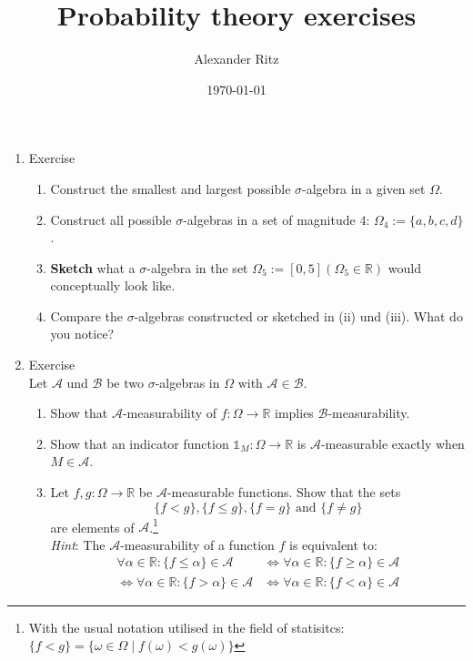 \documentclass[12pt,a4paper]{article}
\title{Probability theory exercises}
\author{Alexander Ritz}
\date{\today}
\begin{document}
\maketitle

\begin{enumerate}

\item Exercise 
\begin{enumerate}[label=(\roman*)]

\item Construct the smallest and largest possible $\sigma$-algebra in a given set $\Omega$.

\item Construct all possible $\sigma$-algebras in a set of magnitude $4$: $\Omega_4:=\{a, b, c, d\}$.

\item\textbf{Sketch} what a $\sigma$-algebra in the set $\Omega_5:= \left[0, 5 \right] (\Omega_5 \in \mathbb{R})$ would conceptually look like.

\item Compare the $\sigma$-algebras constructed or sketched in (ii) und (iii). What do you notice?

\end{enumerate}


\item Exercise \\
Let $\mathscr{A}$ und $\mathscr{B}$ be two $\sigma$-algebras in $\Omega$ with $\mathscr{A} \in \mathscr{B}$.
\begin{enumerate}[label=(\roman*)]

\item Show that $\mathscr{A}$-measurability of $f:\Omega \to \mathbb{R}$ implies $\mathscr{B}$-measurability.

\item Show that an indicator function $\mathds{1}_M:\Omega \to \mathbb{R}$ is $\mathscr{A}$-measurable exactly when $M \in \mathscr{A}$.

\item Let $f, g: \Omega\to \mathbb{R}$ be $\mathscr{A}$-measurable functions. Show that the sets \[\{f < g\}, \{f \leq g\}, \{f = g\}\text{ and }\{ f \neq g\}\] are elements of $\mathscr{A}$.\footnote{With the usual notation utilised in the field of statisitcs: $\{f < g\} = \{\omega \in \Omega \mid f(\omega) < g(\omega)\}$} \\ \textit{Hint}: The $\mathscr{A}$-measurability of a function $f$ is equivalent to:\begin{align*}
\forall \alpha \in \mathbb{R} : \{ f \leq \alpha\} \in \mathscr{A} &\iff \forall \alpha \in \mathbb{R} : \{ f \geq \alpha\} \in \mathscr{A}\\ \iff \forall \alpha \in \mathbb{R} : \{ f > \alpha\} \in \mathscr{A} &\iff \forall \alpha \in \mathbb{R} : \{ f < \alpha\} \in \mathscr{A}
\end{align*}



\end{enumerate}
\end{enumerate}
\end{document}
